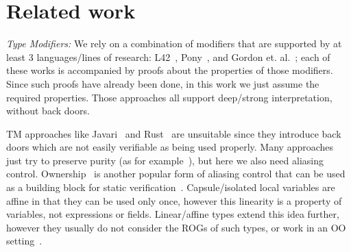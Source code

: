 
\saveSpace
\section{Related work}
\label{s:related}
\saveSpace

\textit{Type Modifiers:}
We rely on a combination of modifiers that are supported by at least 3 languages/lines of research:
L42~\cite{ServettoZucca15,ServettoEtAl13a,JOT:issue_2011_01/article1,GianniniEtAl16},
Pony~\cite{clebsch2015deny,clebsch2017orca}, and Gordon et. al.~\cite{GordonEtAl12}; 
each of these works is accompanied by proofs about the properties of those modifiers.
Since such proofs have already been done, in this work we just assume the required properties.
Those approaches all support deep/strong interpretation, without back doors.

TM approaches like Javari~\cite{TschantzErnst05,Boyland06} and Rust~\cite{matsakis2014rust} are unsuitable since they introduce back doors which are not easily verifiable as being used properly.
Many approaches just try to preserve purity (as for example~\cite{pearce2011jpure}), but here we also need aliasing control.
Ownership~\cite{ClarkeEtAl13,ZibinEtAl10,DietlEtAl07} is another popular form of aliasing control that can be used as a building block for static verification~\cite{%
muller2002modular,%
barnett2011specification%
}.
Capsule/isolated local variables are affine in that they can be used only once, however this linearity is a property of variables, not expressions or fields. Linear/affine types extend this idea further, however they usually do not consider the ROGs of such types, or work in an OO setting~\cite{ahmed20073,fahndrich2002adoption}.


